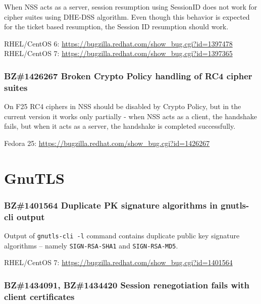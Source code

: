     When NSS acts as a server, session resumption using SessionID does not work
    for cipher suites using DHE-DSS algorithm. Even though this behavior is
    expected for the ticket based resumption, the Session ID resumption should work.

    \medskip\noindent RHEL/CentOS 6: \url{https://bugzilla.redhat.com/show_bug.cgi?id=1397478}
    \newline\noindent RHEL/CentOS 7: \url{https://bugzilla.redhat.com/show_bug.cgi?id=1397365}

\subsubsection*{BZ\#1426267  \newline
    Broken Crypto Policy handling of RC4 cipher suites}

    On F25 RC4 ciphers in NSS should be disabled by Crypto Policy, but in the
    current version it works only partially - when NSS acts as a client,
    the handshake fails, but when it acts as a server, the handshake is
    completed successfully.

    \medskip\noindent Fedora 25: \url{https://bugzilla.redhat.com/show_bug.cgi?id=1426267}

\section{GnuTLS}
\subsubsection*{BZ\#1401564  \newline
    Duplicate PK signature algorithms in gnutls-cli output}

    Output of \texttt{gnutls-cli -l} command contains duplicate public key signature
    algorithms -- namely \texttt{SIGN-RSA-SHA1} and \texttt{SIGN-RSA-MD5}.

    \medskip\noindent RHEL/CentOS 7: \url{https://bugzilla.redhat.com/show_bug.cgi?id=1401564}

\subsubsection*{BZ\#1434091, BZ\#1434420  \newline
    Session renegotiation fails with client certificates}

